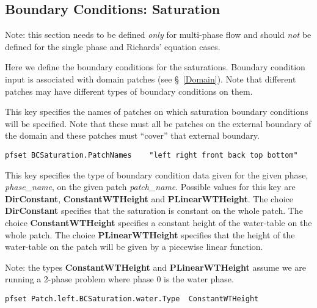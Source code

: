 
\subsection{Boundary Conditions: Saturation}
\label{Boundary Conditions: Saturation}

Note: this section needs to be defined {\em only} for multi-phase flow
and should {\em not} be defined for the single phase and Richards'
equation cases. 

Here we define the boundary conditions for the saturations.  Boundary
condition input is associated with domain patches (see \S~\ref{Domain}).
Note that different patches may have different types of boundary
conditions on them.

{
This key specifies the names of patches on which saturation boundary
conditions will be specified.  Note that these must all be patches on
the external boundary of the domain and these patches must ``cover''
that external boundary.
}
\begin{display}\begin{verbatim}
pfset BCSaturation.PatchNames    "left right front back top bottom"
\end{verbatim}\end{display}

{
This key specifies the type of boundary condition data given for the
given phase, {\em phase\_name}, on the given patch {\em patch\_name}.
Possible values for this key are {\bf DirConstant},
{\bf ConstantWTHeight} and {\bf PLinearWTHeight}.  The choice
{\bf DirConstant} specifies that the saturation is constant on the whole
patch.  The choice {\bf ConstantWTHeight} specifies a constant height of
the water-table on the whole patch.  The choice {\bf PLinearWTHeight}
specifies that the height of the water-table on the patch will be given
by a piecewise linear function.

Note: the types {\bf ConstantWTHeight} and {\bf PLinearWTHeight} assume
we are running a 2-phase problem where phase 0 is the water phase.
}
\begin{display}\begin{verbatim}
pfset Patch.left.BCSaturation.water.Type  ConstantWTHeight
\end{verbatim}\end{display}


